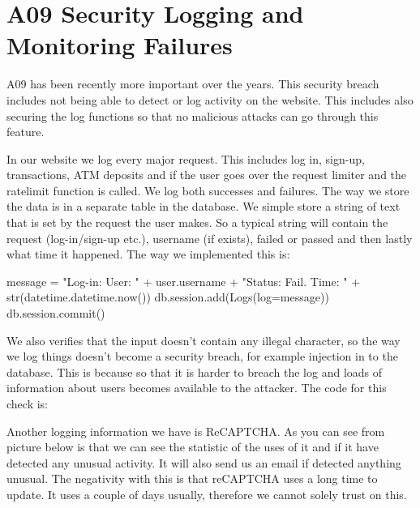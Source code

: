 \section{A09 Security Logging and Monitoring Failures}

A09 has been recently more important over the years. This security breach includes not being able to detect or log activity on the website. This includes also securing the log functions so that no malicious attacks can go through this feature. 

In our website we log every major request. This includes log in, sign-up, transactions, ATM deposits and if the user goes over the request limiter and the ratelimit function is called. We log both successes and failures. The way we store the data is in a separate table in the database. We simple store a string of text that is set by the request the user makes. So a typical string will contain the request (log-in/sign-up etc.), username (if exists), failed or passed and then lastly what time it happened. The way we implemented this is: 
\begin{python}
message = "Log-in: User: " + user.username + "Status: Fail. Time: " + str(datetime.datetime.now())
db.session.add(Logs(log=message))
db.session.commit()
\end{python}

We also verifies that the input doesn’t contain any illegal character, so the way we log things doesn’t become a security breach, for example injection in to the database. This is because so that it is harder to breach the log and loads of information about users becomes available to the attacker. The code for this check is:

\pagebreak
{}

Another logging information we have is ReCAPTCHA. As you can see from picture below is that we can see the statistic of the uses of it and if it have detected any unusual activity. It will also send us an email if detected anything unusual. The negativity with this is that reCAPTCHA uses a long time to update. It uses a couple of days usually, therefore we cannot solely trust on this. 

